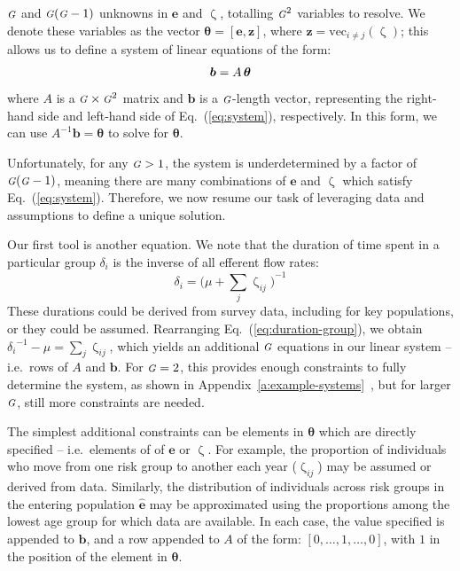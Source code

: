 \documentclass[10pt]{article}
\numberwithin{equation}{section}
\renewcommand{\zeta}{\upzeta}
\newcommand{\G}{{\mbox{\footnotesize{\textit{G}}}}}
\newcommand{\eq}[1]{Eq.~(\ref{#1})}
\newcommand{\app}[1]{Appendix~\ref{#1}~\nameref{#1}}
\begin{document}
$\G$ and $\G(\G-1)$ unknowns in $\bm{e}$ and $\zeta$, totalling $\G^2$ variables to resolve.
We denote these variables as the vector $\bm{\theta} = \left[\bm{e}, \bm{z}\right]$,
where $\bm{z} = \mathrm{vec}_{i \ne j}(\zeta)$;
this allows us to define
a system of linear equations of the form:
\begin{equation}\label{eq:system-matrix}
\bm{b} = A \thinspace \bm{\theta}
\end{equation}
where $A$ is a $\G \times \G^2 $ matrix
and $\bm{b}$ is a $\G$-length vector,
representing the right-hand side and left-hand side of \eq{eq:system}, respectively.
In this form, we can use $A^{-1}\bm{b} = \bm{\theta}$ to solve for $\bm{\theta}$.
\par
Unfortunately, for any $\G > 1$, the system is underdetermined by a factor of $\G(\G-1)$,
meaning there are many combinations of $\bm{e}$ and $\zeta$ which satisfy \eq{eq:system}.
Therefore, we now resume our task of leveraging data and assumptions
to define a unique solution.
\par
Our first tool is another equation.
We note that the duration of time spent in a particular group $\delta_i$
is the inverse of all efferent flow rates:
\begin{equation}\label{eq:duration-group}
\delta_i = {\bigg(\mu + \sum_{j}{\zeta_{ij}}\bigg)}^{-1}
\end{equation}
These durations could be derived from survey data, including for key populations,
or they could be assumed.
Rearranging \eq{eq:duration-group}, we obtain
${\delta_i}^{-1} - \mu = \sum_{j}{\zeta_{ij}}$,
which yields an additional $\G$ equations in our linear system -- i.e.\ rows of $A$ and $\bm{b}$.
For $\G = 2$, this provides enough constraints to fully determine the system,
as shown in \app{a:example-systems},
but for larger $\G$, still more constraints are needed.
\par
The simplest additional constraints can be elements in $\bm{\theta}$ which are directly specified
-- i.e.\ elements of of $\bm{e}$ or $\zeta$.
For example, the proportion of individuals who
move from one risk group to another each year ($\zeta_{ij}$)
may be assumed or derived from data.
Similarly, the distribution of individuals
across risk groups in the entering population $\bm{\hat{e}}$
may be approximated using the proportions among
the lowest age group for which data are available.
In each case, the value specified is appended to $\bm{b}$,
and a row appended to $A$ of the form: $[0,\dots,1,\dots,0]$,
with $1$ in the position of the element in $\bm{\theta}$.
\end{document}
